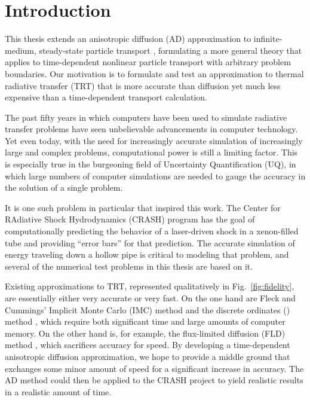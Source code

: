 
\chapter{Introduction}\label{chap:introduction}
This thesis extends an anisotropic diffusion (AD) approximation to
infinite-medium, steady-state particle transport \cite{Mor2007,Lar2009c},
formulating a more general theory that applies to
time-dependent nonlinear particle transport with arbitrary problem boundaries.
Our motivation is to formulate and test an approximation to thermal radiative
transfer (TRT) that is more accurate than diffusion yet much less expensive
than a time-dependent transport calculation.

The past fifty years in which computers have been used to simulate radiative
transfer problems \cite{Cam1964,Cam1969} have seen unbelievable
advancements in computer technology.
Yet even today, with the need for increasingly accurate simulation of
increasingly
large and complex problems, computational power is still a limiting factor.
This is especially true in the burgeoning field of Uncertainty Quantification
(UQ), in which large numbers of computer simulations are needed to gauge the
accuracy in the solution of a single problem.

It is one such problem in particular that inspired this work. The Center for
RAdiative Shock Hydrodynamics (CRASH) program \cite{Crash2010} has the goal of
computationally predicting the behavior of a laser-driven shock in a
xenon-filled tube and providing ``error bars'' for that prediction. The accurate
simulation of energy traveling down a hollow pipe is critical to modeling that
problem, and several of the numerical test problems in this thesis are based
on it.

Existing approximations to TRT, represented qualitatively in
Fig.~\ref{fig:fidelity}, are essentially either very accurate or very fast. On
the one hand are Fleck and Cummings' Implicit Monte Carlo (IMC) method
\cite{Fle1971} and the discrete ordinates (\SN) method \cite{Ada1998a}, which
require both significant time and large amounts of computer memory. On the
other hand is, for example, the flux-limited diffusion (FLD) method
\cite{Ols2000}, which sacrifices accuracy for speed. By developing a
time-dependent anisotropic diffusion approximation, we hope to provide a middle
ground that exchanges some minor amount of speed for a significant increase in
accuracy. The AD method could then be applied to the CRASH project to yield
realistic results in a realistic amount of time.

